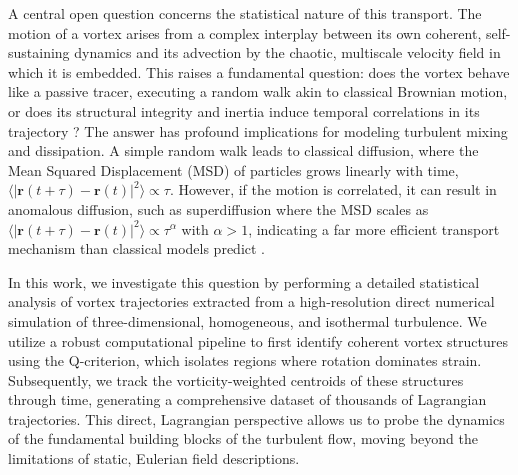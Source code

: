 \documentclass[]{article}
\begin{document}
A central open question concerns the statistical nature of this transport. The motion of a vortex arises from a complex interplay between its own coherent, self-sustaining dynamics and its advection by the chaotic, multiscale velocity field in which it is embedded. This raises a fundamental question: does the vortex behave like a passive tracer, executing a random walk akin to classical Brownian motion, or does its structural integrity and inertia induce temporal correlations in its trajectory \citep{maiti2025vorticitypackingeffectslong}? The answer has profound implications for modeling turbulent mixing and dissipation. A simple random walk leads to classical diffusion, where the Mean Squared Displacement (MSD) of particles grows linearly with time, $\langle |\mathbf{r}(t+\tau) - \mathbf{r}(t)|^2 \rangle \propto \tau$. However, if the motion is correlated, it can result in anomalous diffusion, such as superdiffusion where the MSD scales as $\langle |\mathbf{r}(t+\tau) - \mathbf{r}(t)|^2 \rangle \propto \tau^\alpha$ with $\alpha > 1$, indicating a far more efficient transport mechanism than classical models predict \citep{leoncini2002jetsstickinessanomaloustransport,maiti2025vorticitypackingeffectslong}.

In this work, we investigate this question by performing a detailed statistical analysis of vortex trajectories extracted from a high-resolution direct numerical simulation of three-dimensional, homogeneous, and isothermal turbulence. We utilize a robust computational pipeline to first identify coherent vortex structures using the Q-criterion, which isolates regions where rotation dominates strain. Subsequently, we track the vorticity-weighted centroids of these structures through time, generating a comprehensive dataset of thousands of Lagrangian trajectories. This direct, Lagrangian perspective allows us to probe the dynamics of the fundamental building blocks of the turbulent flow, moving beyond the limitations of static, Eulerian field descriptions.
\end{document}
